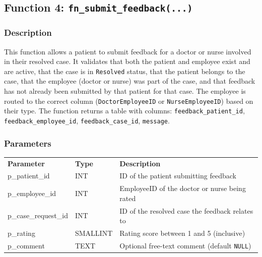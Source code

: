 \documentclass{article}
\newcommand{\theadcell}{\color{white}\bfseries}
\begin{document}

\vspace{1em}

\subsection{Function 4: \texttt{fn\_submit\_feedback(...)}}

\subsubsection{Description}
This function allows a patient to submit feedback for a doctor or nurse involved in their resolved case. It validates that both the patient and employee exist and are active, that the case is in \texttt{Resolved} status, that the patient belongs to the case, that the employee (doctor or nurse) was part of the case, and that feedback has not already been submitted by that patient for that case. The employee is routed to the correct column (\texttt{DoctorEmployeeID} or \texttt{NurseEmployeeID}) based on their type. The function returns a table with columns: \texttt{feedback\_patient\_id}, \texttt{feedback\_employee\_id}, \texttt{feedback\_case\_id}, \texttt{message}.

\subsubsection{Parameters}

\begin{center}
\begin{tabular}{L{4.5cm} L{2.5cm} L{6.5cm}}
   \theadcell Parameter & \theadcell Type & \theadcell Description \\
   p\_patient\_id      & INT      & ID of the patient submitting feedback \\
   p\_employee\_id     & INT      & EmployeeID of the doctor or nurse being rated \\
   p\_case\_request\_id & INT      & ID of the resolved case the feedback relates to \\
   p\_rating           & SMALLINT & Rating score between 1 and 5 (inclusive) \\
   p\_comment          & TEXT     & Optional free-text comment (default \texttt{NULL}) \\
\end{tabular}
\end{center}
\end{document}
